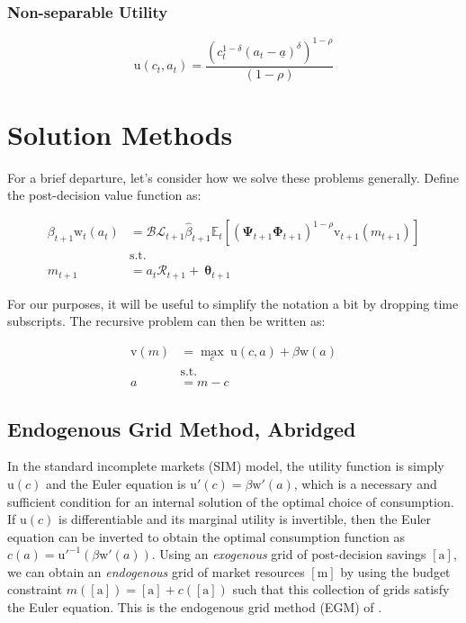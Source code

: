 \documentclass{article}
\newcommand{\DiscFac}{\beta}
\newcommand{\uFunc}{\mathrm{u}}
\newcommand{\Alive}{\mathcal{L}}
\newcommand{\Ex}{\mathbb{E}}
\newcommand{\beth}{\mathcal{B}}
\newcommand{\CRRA}{\rho}
\newcommand{\PermGroFac}{\pmb{\Phi}}
\newcommand{\vFunc}{\mathrm{v}}
\newcommand{\PermShk}{\mathbf{\Psi}}
\newcommand{\aNrm}{a}
\newcommand{\cNrm}{c}
\newcommand{\RNrm}{\mathcal{R}}
\newcommand{\TranShkEmp}{\pmb{\theta}}
\newcommand{\wealthShare}{\delta}
\newcommand{\wFunc}{\mathrm{w}}
\newcommand{\aRat}{a}
\newcommand{\mRat}{m}
\newcommand{\aMat}{[\mathrm{a}]}
\newcommand{\mMat}{[\mathrm{m}]}
\newcommand{\mNrm}{m}
\begin{document}
\subsubsection{Non-separable Utility}\label{Non-separable Utility}

\begin{equation}
\uFunc(\cNrm_{t}, \aNrm_{t}) = \frac{(\cNrm_{t}^{1-\wealthShare} (\aNrm_{t}- \underline\aNrm)^\wealthShare)^{1-\CRRA}}{(1-\CRRA)}
\end{equation}

\section{Solution Methods}\label{Solution Methods}

For a brief departure, let's consider how we solve these problems generally. Define the post-decision value function as:

\begin{equation}
\begin{align}
\DiscFac_{t+1} \wFunc_{t}(\aNrm_{t}) & = \beth\Alive_{t+1}\hat{\DiscFac}_{t+1}
\Ex_{t}[(\PermShk_{t+1}\PermGroFac_{t+1})^{1-\CRRA}{\vFunc}_{t+1}({m}_{t+1})]  
\\ & \text{s.t.} 
  \\  {m}_{t+1}  & = \aNrm_{t}\RNrm_{t+1}+ ~\TranShkEmp_{t+1}
\end{align}
\end{equation}

For our purposes, it will be useful to simplify the notation a bit by dropping time subscripts. The recursive problem can then be written as:

\begin{equation}
\begin{align}
  \vFunc(\mRat) & = \max_{\cNrm} ~ \uFunc(\cNrm, \aNrm) + \DiscFac \wFunc(\aRat) 
  \\ & \text{s.t.} 
  \\ \aNrm & = \mRat-\cNrm
\end{align}
\end{equation}

\subsection{Endogenous Grid Method, Abridged}\label{Endogenous Grid Method, Abridged}

In the standard incomplete markets (SIM) model, the utility function is simply $\uFunc(\cNrm)$ and the Euler equation is $\uFunc'(\cNrm) = \DiscFac \wFunc'(\aNrm)$, which is a necessary and sufficient condition for an internal solution of the optimal choice of consumption. If $\uFunc(\cNrm)$ is differentiable and its marginal utility is invertible, then the Euler equation can be inverted to obtain the optimal consumption function as $\cNrm(\aNrm) = \uFunc'^{ -1}(\DiscFac \wFunc'(\aNrm))$. Using an \textit{exogenous} grid of post-decision savings $\aMat$, we can obtain an \textit{endogenous} grid of market resources $\mMat$ by using the budget constraint $\mNrm(\aMat) = \aMat + \cNrm(\aMat)$ such that this collection of grids satisfy the Euler equation. This is the endogenous grid method (EGM) of \cite{Carroll_2006}.
\end{document}
